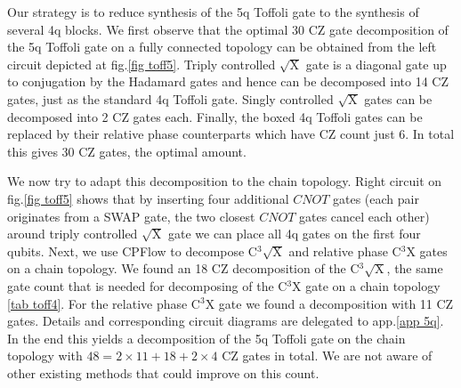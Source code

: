 \documentclass[twocolumn, amsfonts, amssymb, aps, nofootinbib]{revtex4-2}
\newcommand{\CZ}{CZ }
\newcommand{\CX}{CNOT }
\newcommand{\cx}[1]{C${}^{#1}$X}
\newcommand{\package}[1]{\textrm {#1 }}
\newcommand{\cpflow}{\package{CPFlow}}
\begin{document}
Our strategy is to reduce synthesis of the 5q Toffoli gate to the synthesis of several 4q blocks. We first observe that the optimal 30 \CZ gate decomposition of the 5q Toffoli gate on a fully connected topology can be obtained from the left circuit depicted at fig.\ref{fig toff5}. Triply controlled $\sqrt{\text{X}}$ gate is a diagonal gate up to conjugation by the Hadamard gates and hence can be decomposed into 14 \CZ gates, just as the standard 4q Toffoli gate. Singly controlled $\sqrt{\text{X}}$ gates can be decomposed into 2 \CZ gates each. Finally, the boxed 4q Toffoli gates can be replaced by their relative phase counterparts \cite{Maslov} which have \CZ count just 6. In total this gives 30 \CZ gates, the optimal amount. 

We now try to adapt this decomposition to the chain topology. Right circuit on fig.\ref{fig toff5} shows that by inserting four additional $\CX$ gates (each pair originates from a SWAP gate, the two closest $\CX$ gates cancel each other) around triply controlled $\sqrt{\text{X}}$ gate we can place all 4q gates on the first four qubits. Next, we use \cpflow to decompose C${}^{3}\sqrt{\text{X}}$ and relative phase \cx{3} gates on a chain topology. We found an 18 \CZ decomposition of the C${}^{3}\sqrt{\text{X}}$, the same gate count that is needed for decomposing of the \cx{3} gate on a chain topology \ref{tab toff4}. For the relative phase \cx{3} gate we found a decomposition with 11 \CZ gates. Details and corresponding circuit diagrams are delegated to app.\ref{app 5q}. In the end this yields a decomposition of the 5q Toffoli gate on the chain topology with $48=2\times 11+18+2\times4$ \CZ gates in total. We are not aware of other existing methods that could improve on this count.
\end{document}
